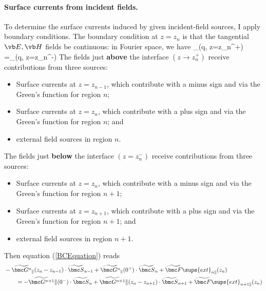 \documentclass[letterpaper]{article}
\renewcommand{\wt}{\widetilde}
\begin{document}
\paragraph{Surface currents from incident fields.}

To determine the surface currents induced by given incident-field
sources, I apply boundary conditions.
The boundary condition at $z=z_n$ is that the tangential $\vb E, \vb H$
fields be continuous: in Fourier space, we have
{ \wt{\bmc F}_{\parallel}(\vb q, z=z_n^+)
 =\wt{\bmc F}_{\parallel}(\vb q, z=z_n^-)
}
The fields just \textbf{above} the interface $(z\to z_n^+)$ receive
contributions from three sources:
\begin{itemize}
 \item Surface currents at $z=z_{n-1}$, which contribute with
       a minus sign and via the Green's function for region $n$;
 \item Surface currents at $z=z_{n}$, which contribute with
       a plus sign and via the Green's function for region $n$; and
 \item external field sources in region $n$.
\end{itemize}
The fields just \textbf{below} the interface $(z=z_n^-)$ receive
contributions from three sources:
\begin{itemize}
 \item Surface currents at $z=z_{n}$, which contribute with
       a minus sign and via the Green's function for region $n+1$;
 \item Surface currents at $z=z_{n+1}$, which contribute with
       a plus sign and via the Green's function for region $n+1$; and
 \item external field sources in region $n+1$.
\end{itemize}
Then equation (\ref{BCEquation}) reads
\begin{align*}
&
-\wt{\bmc G^n}_{\parallel}(z_n-z_{n-1})\cdot \wt{\bmc S}_{n-1}
+\wt{\bmc G^n}_{\parallel}(0^+) \cdot \wt{\bmc S}_{n}
+\wt{\bmc F}\sups{ext}_{n\parallel}(z_n)
\\
&\qquad=
-\wt{\bmc G^{n+1}}{\parallel}(0^-) \cdot \wt{\bmc S}_{n}
+\wt{\bmc G^{n+1}}{\parallel}(z_n-z_{n+1})\cdot \wt{\bmc S}_{n+1}
+\wt{\bmc F}\sups{ext}_{n+1\parallel}(z_n)
\end{align*}
\end{document}

